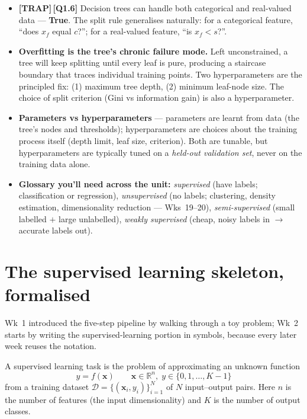 \documentclass[11pt, a4paper]{article}
\newcommand{\trapflag}{\textcolor{trapBd}{\textbf{[TRAP]}}\,}
\begin{document}
\begin{tldrbox}
\begin{itemize}[leftmargin=*]
  \item \trapflag{}\textbf{[Q1.6]} Decision trees can handle both categorical and real-valued data — \textbf{True}. The split rule generalises naturally: for a categorical feature, ``does $x_f$ equal $c$?''; for a real-valued feature, ``is $x_f < s$?''.
  \item \textbf{Overfitting is the tree's chronic failure mode.} Left unconstrained, a tree will keep splitting until every leaf is pure, producing a staircase boundary that traces individual training points. Two hyperparameters are the principled fix: (1) maximum tree depth, (2) minimum leaf-node size. The choice of split criterion (Gini vs information gain) is also a hyperparameter.
  \item \textbf{Parameters vs hyperparameters} — parameters are learnt from data (the tree's nodes and thresholds); hyperparameters are choices about the training process itself (depth limit, leaf size, criterion). Both are tunable, but hyperparameters are typically tuned on a \emph{held-out validation set}, never on the training data alone.
  \item \textbf{Glossary you'll need across the unit:} \emph{supervised} (have labels; classification or regression), \emph{unsupervised} (no labels; clustering, density estimation, dimensionality reduction — Wks~19--20), \emph{semi-supervised} (small labelled $+$ large unlabelled), \emph{weakly supervised} (cheap, noisy labels in $\rightarrow$ accurate labels out).
\end{itemize}
\end{tldrbox}

\section{The supervised learning skeleton, formalised}

Wk~1 introduced the five-step pipeline by walking through a toy problem; Wk~2 starts by writing the supervised-learning portion in symbols, because every later week reuses the notation.

\begin{defbox}
A supervised learning task is the problem of approximating an unknown function
\[
y = f(\mathbf{x}) \qquad \mathbf{x} \in \mathbb{R}^n,\; y \in \{0, 1, \ldots, K-1\}
\]
from a training dataset $\mathcal{D} = \{(\mathbf{x}_i, y_i)\}_{i=1}^N$ of $N$ input--output pairs. Here $n$ is the number of features (the input dimensionality) and $K$ is the number of output classes.
\end{defbox}
\end{document}
